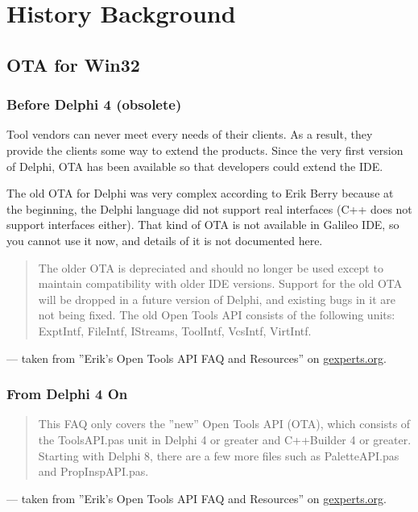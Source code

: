 \chapter{History Background}
\newpage
\section{OTA for Win32}
\subsection{Before Delphi 4 (obsolete)} 
Tool vendors can never meet every needs of their clients. As a result, they
provide the clients some way to extend the products. Since the very first version of
Delphi, OTA has been available so that developers could extend the IDE.

The old OTA for Delphi was very complex according to Erik Berry because at the 
beginning, the Delphi language did not support real interfaces (C++ does not
support interfaces either). That kind of OTA is not available in Galileo IDE, so
you cannot use it now, and details of it is not documented here.
\begin{sffamily} 

\begin{quote} 
The older OTA is depreciated and should no longer be used except 
to maintain compatibility with older IDE versions. Support for the old OTA will 
be dropped in a future version of Delphi, and existing bugs in it are not being 
fixed. The old Open Tools API consists of the following units: ExptIntf, 
FileIntf, IStreams, ToolIntf, VcsIntf, VirtIntf.
\end{quote}
--- taken from ''Erik's Open Tools API FAQ and Resources'' on 
\underline{gexperts.org}.
\end{sffamily}

\subsection{From Delphi 4 On}
\begin{sffamily}
\begin{quote} 
This FAQ only covers the ''new'' Open Tools API (OTA), which 
consists of the ToolsAPI.pas unit in Delphi 4 or greater and C++Builder 4 or 
greater. Starting with Delphi 8, there are a few more files such as 
PaletteAPI.pas and PropInspAPI.pas.
\end{quote}
--- taken from ''Erik's Open Tools API FAQ and Resources'' on 
\underline{gexperts.org}.
\end{sffamily}

